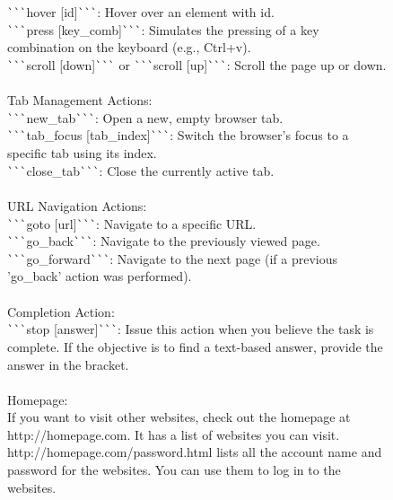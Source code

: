 \begin{figure}[th]
{{\texttt{\`}\texttt{\`}\texttt{\`}hover [id]\texttt{\`}\texttt{\`}\texttt{\`}: Hover over an element with id.\\
\texttt{\`}\texttt{\`}\texttt{\`}press [key\_comb]\texttt{\`}\texttt{\`}\texttt{\`}:  Simulates the pressing of a key combination on the keyboard (e.g., Ctrl+v).\\
\texttt{\`}\texttt{\`}\texttt{\`}scroll [down]\texttt{\`}\texttt{\`}\texttt{\`} or \texttt{\`}\texttt{\`}\texttt{\`}scroll [up]\texttt{\`}\texttt{\`}\texttt{\`}: Scroll the page up or down.
\\~\\
Tab Management Actions:\\
\texttt{\`}\texttt{\`}\texttt{\`}new\_tab\texttt{\`}\texttt{\`}\texttt{\`}: Open a new, empty browser tab.\\
\texttt{\`}\texttt{\`}\texttt{\`}tab\_focus [tab\_index]\texttt{\`}\texttt{\`}\texttt{\`}: Switch the browser's focus to a specific tab using its index.\\
\texttt{\`}\texttt{\`}\texttt{\`}close\_tab\texttt{\`}\texttt{\`}\texttt{\`}: Close the currently active tab.
\\~\\
URL Navigation Actions:\\
\texttt{\`}\texttt{\`}\texttt{\`}goto [url]\texttt{\`}\texttt{\`}\texttt{\`}: Navigate to a specific URL.\\
\texttt{\`}\texttt{\`}\texttt{\`}go\_back\texttt{\`}\texttt{\`}\texttt{\`}: Navigate to the previously viewed page.\\
\texttt{\`}\texttt{\`}\texttt{\`}go\_forward\texttt{\`}\texttt{\`}\texttt{\`}: Navigate to the next page (if a previous 'go\_back' action was performed).
\\~\\
Completion Action:\\
\texttt{\`}\texttt{\`}\texttt{\`}stop [answer]\texttt{\`}\texttt{\`}\texttt{\`}: Issue this action when you believe the task is complete. If the objective is to find a text-based answer, provide the answer in the bracket.
\\~\\
Homepage:\\
If you want to visit other websites, check out the homepage at http://homepage.com. It has a list of websites you can visit.\\
http://homepage.com/password.html lists all the account name and password for the websites. You can use them to log in to the websites.
\\~\\
}}
\end{figure}
